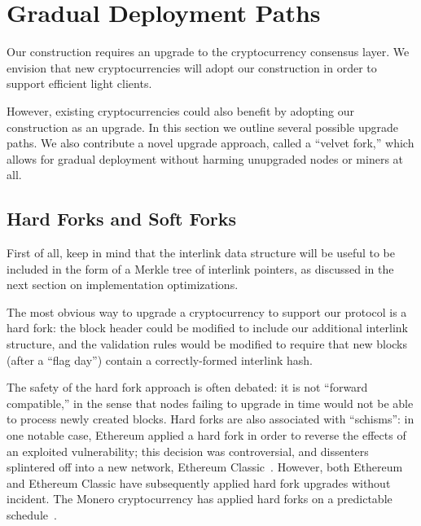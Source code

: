 \section{Gradual Deployment Paths}

\label{sec:forks}
Our construction requires an upgrade to the cryptocurrency consensus layer.
We envision that new cryptocurrencies will adopt our construction in order to support efficient light clients.

However, existing cryptocurrencies could also benefit by adopting our construction as an upgrade.
In this section we outline several possible upgrade paths. We also contribute a novel upgrade approach, called a ``velvet fork,'' which allows for gradual deployment without harming unupgraded nodes or miners at all.

\subsection{Hard Forks and Soft Forks}

First of all, keep in mind that the interlink data structure will be useful to
be included in the form of a Merkle tree of interlink pointers, as discussed in
the next section on implementation optimizations.

The most obvious way to upgrade a cryptocurrency to support our protocol is a hard fork: the block header could be modified to include our additional interlink structure, and the validation rules would be modified to require that new blocks (after a ``flag day'') contain a correctly-formed interlink hash.

The safety of the hard fork approach is often debated: it is not ``forward compatible,'' in the sense that nodes failing to upgrade in time would not be able to process newly created blocks. Hard forks are also associated with ``schisms'': in one notable case, Ethereum applied a hard fork in order to reverse the effects of an exploited vulnerability; this decision was controversial, and dissenters splintered off into a new network, Ethereum Classic~\cite{daofork}. However, both Ethereum and Ethereum Classic have subsequently applied hard fork upgrades without incident. The Monero cryptocurrency has applied hard forks on a predictable schedule~\cite{monerohardforks}.

